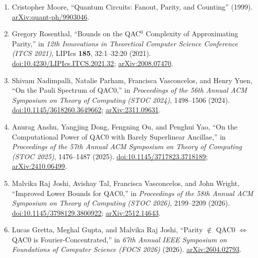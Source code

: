 \begin{enumerate}[label={},leftmargin=4.8em,labelsep=0.5em]
  \footnotesize
  \item[\textup{[Moo99]}]\label{ref:95fc-moore}
  Cristopher Moore, ``Quantum Circuits: Fanout, Parity, and Counting''
(1999).
\href{https://arxiv.org/abs/quant-ph/9903046}{arXiv:quant-ph/9903046}.

  \item[\textup{[Ros21]}]\label{ref:95fc-rosenthal}
  Gregory Rosenthal, ``Bounds on the QAC$^0$ Complexity of Approximating
Parity,'' in \emph{12th Innovations in Theoretical Computer Science
Conference (ITCS 2021)}, LIPIcs \textbf{185}, 32:1--32:20 (2021).
\href{https://doi.org/10.4230/LIPIcs.ITCS.2021.32}{doi:10.4230/LIPIcs.ITCS.2021.32};
\href{https://arxiv.org/abs/2008.07470}{arXiv:2008.07470}.

  \item[\textup{[NPVY24]}]\label{ref:95fc-npv}
  Shivam Nadimpalli, Natalie Parham, Francisca Vasconcelos, and Henry Yuen,
``On the Pauli Spectrum of QAC0,'' in \emph{Proceedings of the 56th Annual
ACM Symposium on Theory of Computing (STOC 2024)}, 1498--1506 (2024).
\href{https://doi.org/10.1145/3618260.3649662}{doi:10.1145/3618260.3649662};
\href{https://arxiv.org/abs/2311.09631}{arXiv:2311.09631}.

  \item[\textup{[ADOY25]}]\label{ref:95fc-adoy}
  Anurag Anshu, Yangjing Dong, Fengning Ou, and Penghui Yao, ``On the
Computational Power of QAC0 with Barely Superlinear Ancillae,'' in
\emph{Proceedings of the 57th Annual ACM Symposium on Theory of Computing
(STOC 2025)}, 1476--1487 (2025).
\href{https://doi.org/10.1145/3717823.3718189}{doi:10.1145/3717823.3718189};
\href{https://arxiv.org/abs/2410.06499}{arXiv:2410.06499}.

  \item[\textup{[JTVW26]}]\label{ref:95fc-jtvw}
  Malvika Raj Joshi, Avishay Tal, Francisca Vasconcelos, and John Wright,
``Improved Lower Bounds for QAC0,'' in \emph{Proceedings of the 58th Annual
ACM Symposium on Theory of Computing (STOC 2026)}, 2199--2209 (2026).
\href{https://doi.org/10.1145/3798129.3800922}{doi:10.1145/3798129.3800922};
\href{https://arxiv.org/abs/2512.14643}{arXiv:2512.14643}.

  \item[\textup{[GGJ26]}]\label{ref:95fc-ggj}
  Lucas Gretta, Meghal Gupta, and Malvika Raj Joshi, ``Parity
$\notin$ QAC0 $\Longleftrightarrow$ QAC0 is Fourier-Concentrated,'' in
\emph{67th Annual IEEE Symposium on Foundations of Computer Science (FOCS
2026)} (2026).
\href{https://arxiv.org/abs/2604.02793}{arXiv:2604.02793}.


\end{enumerate}
